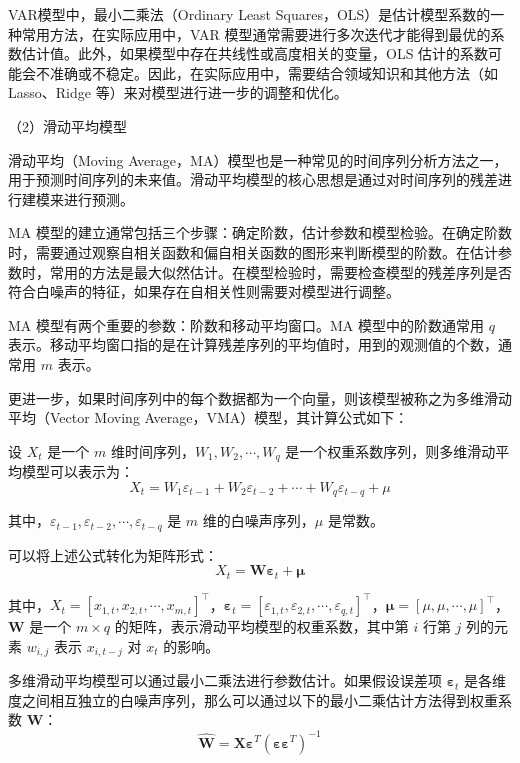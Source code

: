 \documentclass[master]{thesis-uestc}
\begin{document}
VAR模型中，最小二乘法（Ordinary Least Squares，OLS）是估计模型系数的一种常用方法，在实际应用中，VAR 模型通常需要进行多次迭代才能得到最优的系数估计值。此外，如果模型中存在共线性或高度相关的变量，OLS 估计的系数可能会不准确或不稳定。因此，在实际应用中，需要结合领域知识和其他方法（如 Lasso、Ridge 等）来对模型进行进一步的调整和优化。

（2）滑动平均模型

滑动平均（Moving Average，MA）模型也是一种常见的时间序列分析方法之一，用于预测时间序列的未来值。滑动平均模型的核心思想是通过对时间序列的残差进行建模来进行预测。

MA 模型的建立通常包括三个步骤：确定阶数，估计参数和模型检验。在确定阶数时，需要通过观察自相关函数和偏自相关函数的图形来判断模型的阶数。在估计参数时，常用的方法是最大似然估计。在模型检验时，需要检查模型的残差序列是否符合白噪声的特征，如果存在自相关性则需要对模型进行调整。

MA 模型有两个重要的参数：阶数和移动平均窗口。MA 模型中的阶数通常用 $q$ 表示。移动平均窗口指的是在计算残差序列的平均值时，用到的观测值的个数，通常用 $m$ 表示。

更进一步，如果时间序列中的每个数据都为一个向量，则该模型被称之为多维滑动平均（Vector Moving Average，VMA）模型，其计算公式如下：

设 $X_{t}$ 是一个 $m$ 维时间序列，$W_{1},W_{2},\cdots,W_{q}$ 是一个权重系数序列，则多维滑动平均模型可以表示为：
\begin{equation}
    X_{t} = W_{1}\varepsilon_{t-1} + W_{2}\varepsilon_{t-2} + \cdots + W_{q}\varepsilon_{t-q} + \mu 
\end{equation}


其中，$\varepsilon_{t-1},\varepsilon_{t-2},\cdots,\varepsilon_{t-q}$ 是 $m$ 维的白噪声序列，$\mu$ 是常数。

可以将上述公式转化为矩阵形式：
\begin{equation}
    X_t = \boldsymbol{W}\boldsymbol{\varepsilon}_{t} + \boldsymbol{\mu}
\end{equation}

其中，$X_t = [x_{1,t},x_{2,t},\cdots,x_{m,t}]^{\top}$，$\boldsymbol{\varepsilon}_{t} = [\varepsilon_{1,t},\varepsilon_{2,t},\cdots,\varepsilon_{q,t}]^{\top}$，$\boldsymbol{\mu} = [\mu,\mu,\cdots,\mu]^{\top}$，$\boldsymbol{W}$ 是一个 $m \times q$ 的矩阵，表示滑动平均模型的权重系数，其中第 $i$ 行第 $j$ 列的元素 $w_{i,j}$ 表示 $x_{i,t-j}$ 对 $x_{t}$ 的影响。

多维滑动平均模型可以通过最小二乘法进行参数估计。如果假设误差项 $\boldsymbol{\varepsilon}_{t}$ 是各维度之间相互独立的白噪声序列，那么可以通过以下的最小二乘估计方法得到权重系数 $\boldsymbol{W}$：
\begin{equation}
    \hat{\boldsymbol{W}} = \boldsymbol{X}\boldsymbol{\varepsilon}^{T}(\boldsymbol{\varepsilon}\boldsymbol{\varepsilon}^{T})^{-1}
\end{equation}
\end{document}
